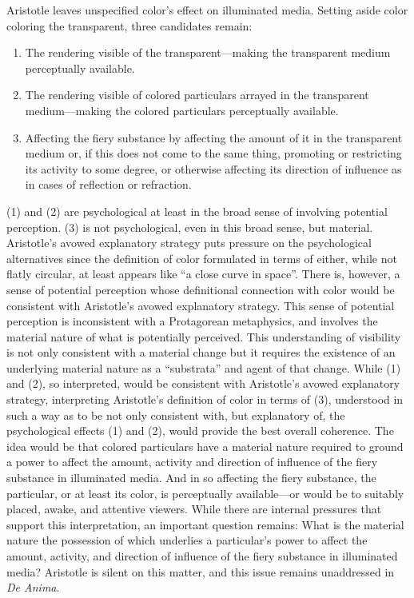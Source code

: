 Aristotle leaves unspecified color's effect on illuminated media. Setting aside color coloring the transparent, three candidates remain:
\begin{enumerate}[(1)]
	\item The rendering visible of the transparent---making the transparent medium perceptually available.
	\item The rendering visible of colored particulars arrayed in the transparent medi\-um\----\-making the colored particulars perceptually available. 
	\item Affecting the fiery substance by affecting the amount of it in the transparent medium or, if this does not come to the same thing, promoting or restricting its activity to some degree, or otherwise affecting its direction of influence as in cases of reflection or refraction. 
\end{enumerate}
(1) and (2) are psychological at least in the broad sense of involving potential perception. (3) is not psychological, even in this broad sense, but material. Aristotle's avowed explanatory strategy puts pressure on the psychological alternatives since the definition of color formulated in terms of either, while not flatly circular, at least appears like ``a close curve in space''. There is, however, a sense of potential perception whose definitional connection with color would be consistent with Aristotle's avowed explanatory strategy. This sense of potential perception is inconsistent with a Protagorean metaphysics, and involves the material nature of what is potentially perceived. This understanding of visibility is not only consistent with a material change but it requires the existence of an underlying material nature as a ``substrata'' and agent of that change. While (1) and (2), so interpreted, would be consistent with Aristotle's avowed explanatory strategy, interpreting Aristotle's definition of color in terms of (3), understood in such a way as to be not only consistent with, but explanatory of, the psychological effects (1) and (2), would provide the best overall coherence. The idea would be that colored particulars have a material nature required to ground a power to affect the amount, activity and direction of influence of the fiery substance in illuminated media. And in so affecting the fiery substance, the particular, or at least its color, is perceptually available---or would be to suitably placed, awake, and attentive viewers. While there are internal pressures that support this interpretation, an important question remains: What is the material nature the possession of which underlies a particular's power to affect the amount, activity, and direction of influence of the fiery substance in illuminated media?  Aristotle is silent on this matter, and this issue remains unaddressed in \emph{De Anima}. 


